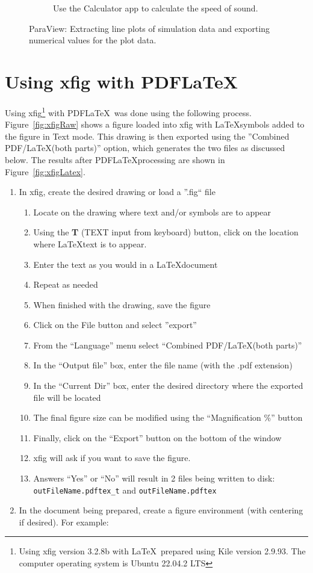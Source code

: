 \begin{appendices}
\begin{figure}
\begin{subfigure}{.95\textwidth}
  \caption{Use the Calculator app to calculate the speed of sound.}
  \label{fig:POL4}
\end{subfigure}
\caption{ParaView: Extracting line plots of simulation data and exporting numerical values for the plot data.}
\label{fig:POL}
\end{figure}

\section{Using xfig with PDF\LaTeX}\label{Asec:xfig}
\setcounter{figure}{0}

Using xfig\footnote{Using xfig version 3.2.8b with \LaTeX\  prepared using Kile version 2.9.93.  The computer operating system is Ubuntu 22.04.2 LTS} with PDF\LaTeX\  was done using the following process. Figure~\ref{fig:xfigRaw} shows a figure loaded into xfig with \LaTeX symbols  added to the figure in Text mode.  This drawing is then exported using the ''Combined PDF/\LaTeX (both parts)'' option, which generates the two files as discussed below.  The results after PDF\LaTeX processing are shown in Figure~\ref{fig:xfigLatex}.

\begin{enumerate}
 \item In xfig, create the desired drawing or load a ''.fig`` file
  \begin{enumerate}
   \item Locate on the drawing where text and/or symbols are to appear
   \item Using the \textbf{T} (TEXT input from keyboard) button,  click on the location
   where \LaTeX text is to appear.
   \item Enter the text as you would in a \LaTeX document
   \item Repeat as needed
   \item When finished with the drawing, save the figure
   \item Click on the File button and select ''export''
   \item From the ``Language'' menu select ``Combined PDF/\LaTeX (both parts)''
   \item In the ``Output file'' box, enter the file name (with the .pdf extension)
   \item In the ``Current Dir'' box, enter the  desired directory where the exported file  will be located
   \item The final figure size can be modified using the ``Magnification \%'' button
   \item Finally, click on the ``Export'' button on the bottom of the window
   \item xfig will ask if you want to save the figure.
   \item Answers ``Yes'' or ``No'' will result in 2 files being written to disk: \verb|outFileName.pdftex_t| and \verb|outFileName.pdftex|
  \end{enumerate}
\item In the document being prepared, create a figure environment (with centering if desired).  For example:


\end{enumerate}
\end{appendices}
